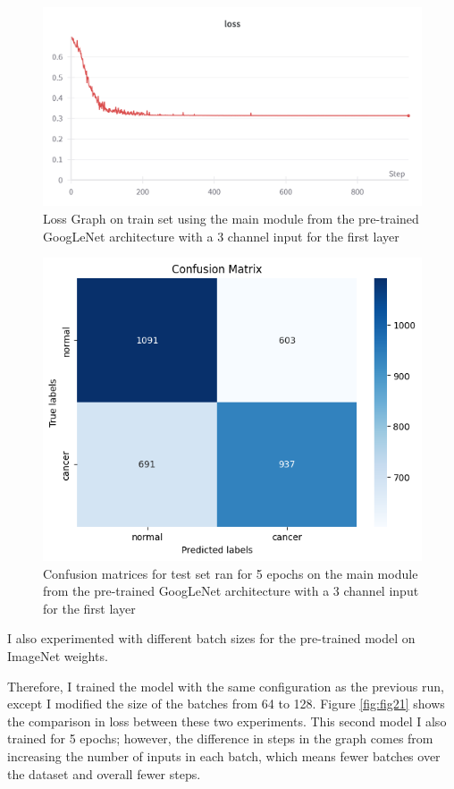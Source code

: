 \begin{figure}[!ht]
    \centering
    \includegraphics[width=1\linewidth]{figures/Figure20.png}
    \caption{Loss Graph on train set using the main module from the pre-trained GoogLeNet architecture with a 3 channel input for the first layer}
    \label{fig:fig19}
\end{figure}

\begin{figure}[!ht]
    \centering
    \includegraphics[width=0.5\linewidth]{figures/Figure21.png}
    \caption{Confusion matrices for test set ran for 5 epochs on the main module from the pre-trained GoogLeNet architecture with a 3 channel input for the first layer}
    \label{fig:fig20}
\end{figure}

I also experimented with different batch sizes for the pre-trained model on ImageNet weights.
  
Therefore, I trained the model with the same configuration as the previous run, except I modified the size of the batches from 64 to 128. Figure \ref{fig:fig21} shows the comparison in loss between these two experiments. This second model I also trained for 5 epochs; however, the difference in steps in the graph comes from increasing the number of inputs in each batch, which means fewer batches over the dataset and overall fewer steps.

